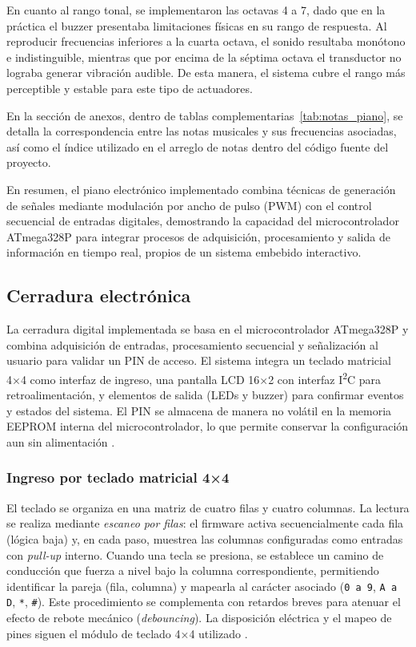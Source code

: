 En cuanto al rango tonal, se implementaron las octavas 4 a 7, dado que en la práctica el buzzer presentaba limitaciones físicas en su rango de respuesta. 
Al reproducir frecuencias inferiores a la cuarta octava, el sonido resultaba monótono e indistinguible, mientras que por encima de la séptima octava el transductor no lograba generar vibración audible. 
De esta manera, el sistema cubre el rango más perceptible y estable para este tipo de actuadores.

En la sección de anexos, dentro de tablas complementarias~\ref{tab:notas_piano}, 
se detalla la correspondencia entre las notas musicales y sus frecuencias asociadas, 
así como el índice utilizado en el arreglo de notas dentro del código fuente del proyecto.

En resumen, el piano electrónico implementado combina técnicas de generación de señales mediante modulación por ancho de pulso (PWM) con el control secuencial de entradas digitales, demostrando la capacidad del microcontrolador ATmega328P para integrar procesos de adquisición, procesamiento y salida de información en tiempo real, propios de un sistema embebido interactivo.

\subsection{Cerradura electrónica}

La cerradura digital implementada se basa en el microcontrolador ATmega328P y combina adquisición de entradas, procesamiento secuencial y señalización al usuario para validar un PIN de acceso. El sistema integra un teclado matricial 4×4 como interfaz de ingreso, una pantalla LCD 16×2 con interfaz I\textsuperscript{2}C para retroalimentación, y elementos de salida (LEDs y buzzer) para confirmar eventos y estados del sistema. El PIN se almacena de manera no volátil en la memoria EEPROM interna del microcontrolador, lo que permite conservar la configuración aun sin alimentación \cite{atmega328p_datasheet}.

\subsubsection{Ingreso por teclado matricial 4×4}
El teclado se organiza en una matriz de cuatro filas y cuatro columnas. La lectura se realiza mediante \textit{escaneo por filas}: el firmware activa secuencialmente cada fila (lógica baja) y, en cada paso, muestrea las columnas configuradas como entradas con \textit{pull-up} interno. Cuando una tecla se presiona, se establece un camino de conducción que fuerza a nivel bajo la columna correspondiente, permitiendo identificar la pareja (fila, columna) y mapearla al carácter asociado (\texttt{0 a 9}, \texttt{A a D}, \texttt{*}, \texttt{\#}). Este procedimiento se complementa con retardos breves para atenuar el efecto de rebote mecánico (\textit{debouncing}). La disposición eléctrica y el mapeo de pines siguen el módulo de teclado 4×4 utilizado \cite{keypad_4x4_okystar}.

